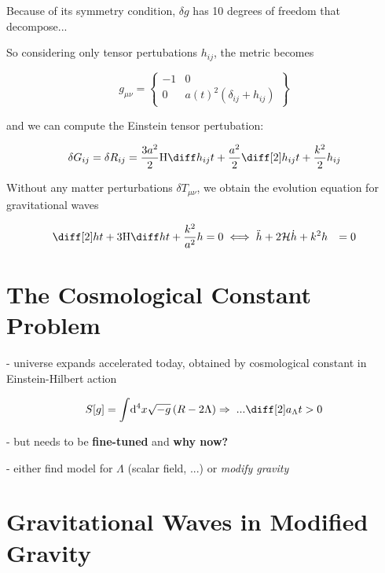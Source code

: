 \documentclass[parskip=half]{scrreprt}
\begin{document}
Because of its symmetry condition, $\delta g$ has 10 degrees of freedom that decompose...

So considering only tensor pertubations $h_{ij}$, the metric becomes

\begin{equation}
	g_{\mu \nu} =
	\begin{Bmatrix}
		-1 & 0 \\
		0 & a(t)^2 \left(\delta_{ij} + h_{ij}\right)
	\end{Bmatrix}
\end{equation}

and we can compute the Einstein tensor pertubation:

\begin{equation}
	\delta\Gtens_{ij} = \delta\Rtens_{ij} = \frac{3 a^2}{2} \Hcosm \dt{h_{ij}} + \frac{a^2}{2}\ddt{h_{ij}} + \frac{k^2}{2}h_{ij}
\end{equation}

Without any matter perturbations $\delta T_{\mu \nu}$, we obtain the evolution equation for gravitational waves

\begin{align}\label{eq:evolution}
	\ddt{h} + 3 \Hcosm \dt{h} + \frac{k^2}{a^2} h &= 0
	\iff \ddconf{h} + 2 \Hconf \dconf{h} + k^2 h &= 0
\end{align}


\section{The Cosmological Constant Problem} %

- universe expands accelerated today, obtained by cosmological constant in Einstein-Hilbert action

\begin{align}\label{eq:einstein_hilbert_action_cc}
	S[g] = \int \! \mathrm{d}^4 x \sqrt{-g} \left( \Rscal - 2\Lambda \right)
	\Rightarrow \; ... \ddt{a_\Lambda} > 0
\end{align}

- but needs to be \textbf{fine-tuned} and \textbf{why now?}

- either find model for $\Lambda$ (scalar field, ...) or \emph{modify gravity}


\section{Gravitational Waves in Modified Gravity}
\end{document}
